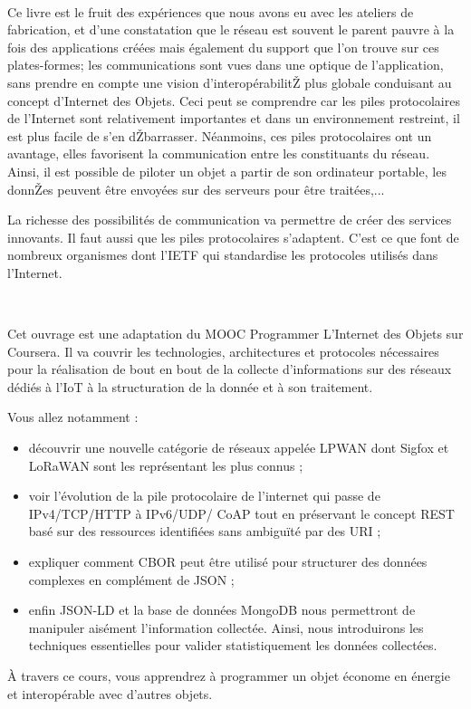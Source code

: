 ~

Ce livre est le fruit des expériences que nous avons eu avec les ateliers de fabrication, et d'une constatation que le réseau est souvent le parent pauvre à la fois des applications créées mais également du support que l'on trouve sur ces plates-formes; les communications sont vues dans une optique de l'application, sans prendre en compte une vision d'interopérabilitŽ plus globale conduisant au concept d'Internet des Objets. Ceci peut se comprendre car les piles protocolaires de l'Internet sont relativement importantes et dans un environnement restreint, il est plus facile de s'en dŽbarrasser. Néanmoins, ces piles protocolaires ont un avantage, elles favorisent la communication entre les constituants du réseau. Ainsi, il est possible de piloter un objet a partir de son ordinateur portable, les donnŽes peuvent être envoyées sur des serveurs pour être traitées,... 

La richesse des possibilités de communication va permettre de créer des services innovants. Il faut aussi que les piles protocolaires s'adaptent. C'est ce que font de nombreux organismes dont l'IETF qui standardise les protocoles utilisés dans l'Internet.

~
~



Cet ouvrage est une adaptation du MOOC Programmer L'Internet des Objets sur Coursera. Il va couvrir les technologies, architectures et protocoles nécessaires pour la réalisation de bout en bout de la collecte d’informations sur des réseaux dédiés à l’IoT à la structuration de la donnée et à son traitement.

Vous allez notamment :
\begin{itemize}
\item découvrir une nouvelle catégorie de réseaux appelée LPWAN dont Sigfox et LoRaWAN sont les représentant les plus connus ;
\item voir l’évolution de la pile protocolaire de l’internet qui passe de IPv4/TCP/HTTP à IPv6/UDP/ CoAP tout en préservant le concept REST basé sur des ressources identifiées sans ambiguïté par des URI ;
\item expliquer comment CBOR peut être utilisé pour structurer des données complexes en complément de JSON ;
\item enfin JSON-LD et la base de données MongoDB nous permettront de manipuler aisément l’information collectée. Ainsi, nous introduirons les techniques essentielles pour valider statistiquement les données collectées.

\end{itemize}
À travers ce cours, vous apprendrez à programmer un objet économe en énergie et interopérable avec d'autres objets.

